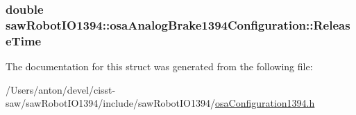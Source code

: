 \subsubsection[{Release\+Time}]{\setlength{\rightskip}{0pt plus 5cm}double saw\+Robot\+I\+O1394\+::osa\+Analog\+Brake1394\+Configuration\+::\+Release\+Time}\label{structsaw_robot_i_o1394_1_1osa_analog_brake1394_configuration_aa948092dd9e95e724395762b36279c1d}


The documentation for this struct was generated from the following file\+:\begin{DoxyCompactItemize}
\item 
/\+Users/anton/devel/cisst-\/saw/saw\+Robot\+I\+O1394/include/saw\+Robot\+I\+O1394/\hyperlink{osa_configuration1394_8h}{osa\+Configuration1394.\+h}\end{DoxyCompactItemize}
